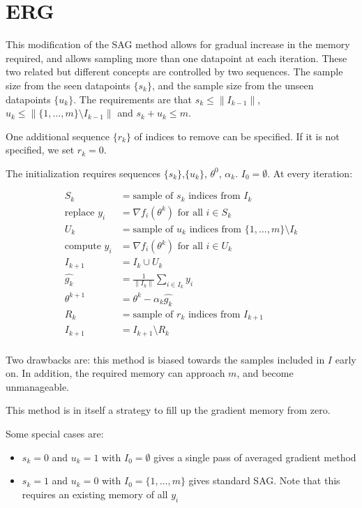 \documentclass[12pt]{article}
\begin{document}
	\section{ERG}
	
	This modification of the SAG method allows for gradual increase in the memory required, and allows sampling more than one datapoint at each iteration. These two related but different concepts are controlled by two sequences. The sample size from the seen datapoints $\{ s_k\} $, and the sample size from the unseen datapoints $\{ u_k \}$. The requirements are that $s_k \leq \|I_{k-1 }\|$, $u_k \leq \|\{1,\ldots,m\} \setminus I_{k-1}\|$ and $s_k + u_k \leq m$. 
	
	One additional sequence $\{r_k\}$ of indices to remove can be specified. If it is not specified, we set $r_k=0$.
	
	The initialization requires sequences $\{ s_k\} $,$\{ u_k \}$,  $\theta^0$, $\alpha_k$.  $I_0 = \emptyset$.
	At every iteration:
	
 	\begin{align*}
	S_k &=  \mbox{sample of } s_k \mbox{ indices from } I_{k}\\
	\mbox{replace } y_i &= \nabla f_i(\theta^k) \mbox{ for all } i \in S_k \\
	U_k &=  \mbox{sample of } u_k \mbox{ indices from } \{1,\ldots,m\} \setminus I_{k}\\
	\mbox{compute } y_i &= \nabla f_i(\theta^k) \mbox{ for all } i \in U_k \\
	I_{k+1} &=  I_{k} \cup U_k\\
	\hat{g_k} & = \frac{1}{\| I_k \| } \sum_{i \in I_k} y_i \\ 
   	\theta^{k+1} &= \theta^k - \alpha_k \hat{g_k}\\
	R_k &=  \mbox{sample of } r_k \mbox{ indices from } I_{k+1}\\
	I_{k+1}&= I_{k+1} \setminus R_k \\
 	\end{align*}
	
	Two drawbacks are: this method is biased towards the samples included in $I$ early on. In addition, the required memory can approach $m$, and become unmanageable. 
	
	This method is in itself a strategy to fill up the gradient memory from zero.
	
	Some special cases are:
	
	\begin{itemize}
		\item $s_k=0$ and $u_k=1$ with $I_0 = \emptyset$ gives a single pass of averaged gradient method \\
		\item $s_k=1$ and $u_k=0$ with $I_0 = \{1,\ldots,m\}$ gives standard SAG. Note that this requires an existing memory of all $y_i$  \\
	\end{itemize}
 
\end{document}
